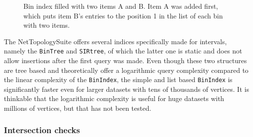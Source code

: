 \begin{figure}[h]
\begin{center}
					\end{center}
					\caption{Bin index filled with two items A and B. Item A was added first, which puts item B's entries to the position 1 in the list of each bin with two items.}
				\end{figure}
				
				The NetTopologySuite offers several indices specifically made for intervals, namely the \texttt{BinTree} and \texttt{SIRtree}, of which the latter one is static and does not allow insertions after the first query was made.
				Even though these two structures are tree based and theoretically offer a logarithmic query complexity compared to the linear complexity of the \texttt{BinIndex}, the simple and list based \texttt{BinIndex} is significantly faster even for larger datasets with tens of thousands of vertices.
				It is thinkable that the logarithmic complexity is useful for huge datasets with millions of vertices, but that has not been tested.
			
			\subsubsection{Intersection checks}
			\label{subsubsec:intersection-checks}
			
